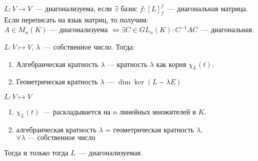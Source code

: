 \begin{definition}
    $L\colon V \to V$~--- диагонализуема, если $\exists$ базис $f\colon [L]^f_f$~--- диагональная матрица.
    Если переписать на язык матриц, то получим: \\ $A\in M_n(K)$ --- диагонализуема $\Leftrightarrow \exists C\in GL_n(K) \colon C^{-1}AC$~---
    диагональная.
\end{definition}
\begin{definition}
    $L\colon V\mapsto V$, $\lambda$~--- собственное число. Тогда:
    \begin{enumerate}
        \item Алгебраическая кратность $\lambda$ --- 
            кратность  $\lambda$ как корня $\chi_L(t)$.
        \item Геометрическая кратность $\lambda$ ---
            $\dim \ker (L-\lambda E)$
    \end{enumerate}
\end{definition}
\begin{theorem}
    $L\colon V\mapsto V$ 
    \begin{enumerate}
        \item $\chi_L(t)$~--- раскладывается на $n$ линейных множителей в $K$.
        \item алгебраическая кратность $\lambda$ = геометрическая кратность $\lambda$, $\forall\lambda\text{~--- собственное число}$ 
    \end{enumerate}
    Тогда и только тогда $L$~--- диагонализуемая.
\end{theorem}
